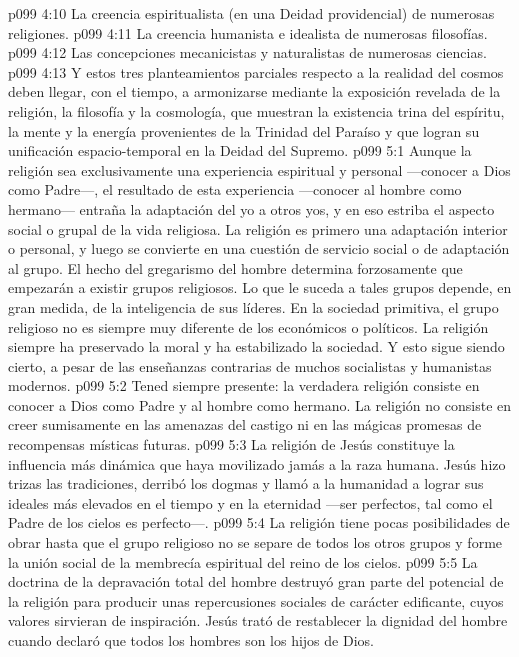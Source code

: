\vs p099 4:10 La creencia espiritualista (en una Deidad providencial) de numerosas religiones.
\vs p099 4:11 La creencia humanista e idealista de numerosas filosofías.
\vs p099 4:12 Las concepciones mecanicistas y naturalistas de numerosas ciencias.
\vs p099 4:13 \pc Y estos tres planteamientos parciales respecto a la realidad del cosmos deben llegar, con el tiempo, a armonizarse mediante la exposición revelada de la religión, la filosofía y la cosmología, que muestran la existencia trina del espíritu, la mente y la energía provenientes de la Trinidad del Paraíso y que logran su unificación espacio\hyp{}temporal en la Deidad del Supremo.
\vs p099 5:1 Aunque la religión sea exclusivamente una experiencia espiritual y personal ---conocer a Dios como Padre---, el resultado de esta experiencia ---conocer al hombre como hermano--- entraña la adaptación del yo a otros yos, y en eso estriba el aspecto social o grupal de la vida religiosa. La religión es primero una adaptación interior o personal, y luego se convierte en una cuestión de servicio social o de adaptación al grupo. El hecho del gregarismo del hombre determina forzosamente que empezarán a existir grupos religiosos. Lo que le suceda a tales grupos depende, en gran medida, de la inteligencia de sus líderes. En la sociedad primitiva, el grupo religioso no es siempre muy diferente de los económicos o políticos. La religión siempre ha preservado la moral y ha estabilizado la sociedad. Y esto sigue siendo cierto, a pesar de las enseñanzas contrarias de muchos socialistas y humanistas modernos.
\vs p099 5:2 Tened siempre presente: la verdadera religión consiste en conocer a Dios como Padre y al hombre como hermano. La religión no consiste en creer sumisamente en las amenazas del castigo ni en las mágicas promesas de recompensas místicas futuras.
\vs p099 5:3 \pc La religión de Jesús constituye la influencia más dinámica que haya movilizado jamás a la raza humana. Jesús hizo trizas las tradiciones, derribó los dogmas y llamó a la humanidad a lograr sus ideales más elevados en el tiempo y en la eternidad ---ser perfectos, tal como el Padre de los cielos es perfecto---.
\vs p099 5:4 \pc La religión tiene pocas posibilidades de obrar hasta que el grupo religioso no se separe de todos los otros grupos y forme la unión social de la membrecía espiritual del reino de los cielos.
\vs p099 5:5 La doctrina de la depravación total del hombre destruyó gran parte del potencial de la religión para producir unas repercusiones sociales de carácter edificante, cuyos valores sirvieran de inspiración. Jesús trató de restablecer la dignidad del hombre cuando declaró que todos los hombres son los hijos de Dios.
